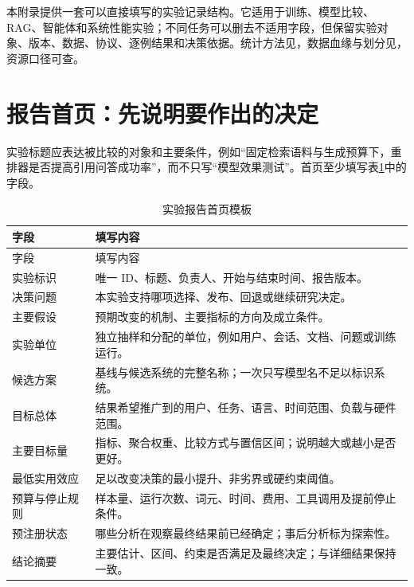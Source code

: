 \documentclass[../textbook.tex]{subfiles}
\begin{document}
\fi
{}

本附录提供一套可以直接填写的实验记录结构。它适用于训练、模型比较、RAG、智能体和系统性能实验；不同任务可以删去不适用字段，但保留实验对象、版本、数据、协议、逐例结果和决策依据。统计方法见，数据血缘与划分见，资源口径可查。

\section{报告首页：先说明要作出的决定}

实验标题应表达被比较的对象和主要条件，例如“固定检索语料与生成预算下，重排器是否提高引用问答成功率”，而不只写“模型效果测试”。首页至少填写表\ref{tab:appendix-report-overview}中的字段。

\begin{longtable}{@{}p{.24\linewidth}p{.67\linewidth}@{}}
\caption{实验报告首页模板}\label{tab:appendix-report-overview}\\
\toprule
字段 & 填写内容\\\midrule
\endfirsthead
\toprule
字段 & 填写内容\\\midrule
\endhead
实验标识 & 唯一 ID、标题、负责人、开始与结束时间、报告版本。\\
决策问题 & 本实验支持哪项选择、发布、回退或继续研究决定。\\
主要假设 & 预期改变的机制、主要指标的方向及成立条件。\\
实验单位 & 独立抽样和分配的单位，例如用户、会话、文档、问题或训练运行。\\
候选方案 & 基线与候选系统的完整名称；一次只写模型名不足以标识系统。\\
目标总体 & 结果希望推广到的用户、任务、语言、时间范围、负载与硬件范围。\\
主要目标量 & 指标、聚合权重、比较方式与置信区间；说明越大或越小是否更好。\\
最低实用效应 & 足以改变决策的最小提升、非劣界或硬约束阈值。\\
预算与停止规则 & 样本量、运行次数、词元、时间、费用、工具调用及提前停止条件。\\
预注册状态 & 哪些分析在观察最终结果前已经确定；事后分析标为探索性。\\
结论摘要 & 主要估计、区间、约束是否满足及最终决定；与详细结果保持一致。\\
\bottomrule
\end{longtable}
\end{document}
